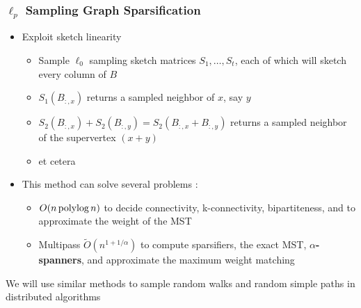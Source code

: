 \documentclass{beamer}
\newcommand{\polylog}{\, \textnormal{polylog} \,}
\begin{document}
\begin{frame}
\frametitle{$\ell_p$ Sampling Graph Sparsification}



\begin{itemize}
	\item Exploit sketch linearity
	\begin{itemize}
		\item Sample $\ell_0$ sampling sketch matrices $S_1, \dots, S_t$, each of which will sketch every column of $B$
		\item $S_1(B_{:,x})$ returns a sampled neighbor of $x$, say $y$
		\item $S_2(B_{:,x}) + S_2(B_{:,y}) = S_2(B_{:,x} + B_{:,y})$ returns a sampled neighbor of the supervertex $(x + y)$
		\item et cetera
	\end{itemize}
	\item This method can solve several problems \cite{ahn2012analyzing, ahn2012graph}:
	\begin{itemize}
		\item $O(n\polylog n)$ to decide connectivity, k-connectivity, bipartiteness, and to approximate the weight of the MST
		\item Multipass $\tilde{O}(n^{1+1/\alpha})$ to compute sparsifiers, the exact MST, \textbf{$\alpha$-spanners}, and approximate the maximum weight matching
	\end{itemize}
\end{itemize}

\begin{block}{}
\begin{center}
We will use similar methods to sample random walks and random simple paths in distributed algorithms
\end{center}
\end{block}

\end{frame}

\end{document}
